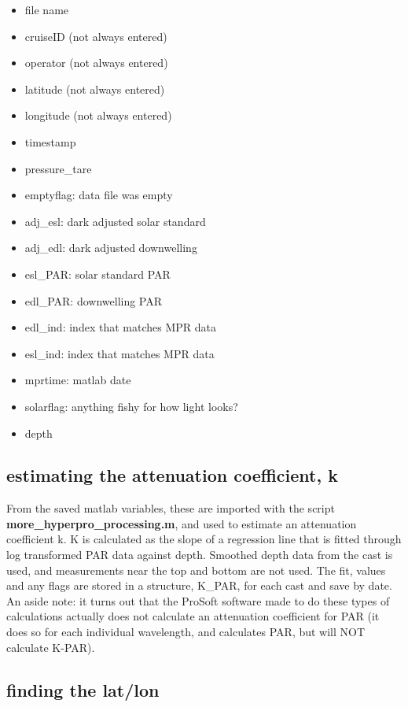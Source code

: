 \documentclass[11pt]{article}
\begin{document}
\begin{itemize}
\item file name \\
\item  cruiseID (not always entered)
\item operator  (not always entered)
\item latitude (not always entered) 
\item   longitude (not always entered)
\item    timestamp 
\item    pressure\_tare 
\item    emptyflag: data file was empty 
\item    adj\_esl: dark adjusted solar standard
\item    adj\_edl: dark adjusted downwelling
\item    esl\_PAR: solar standard PAR
\item    edl\_PAR: downwelling PAR
\item    edl\_ind: index that matches MPR data
\item    esl\_ind: index that matches MPR data
\item    mprtime: matlab date
\item    solarflag: anything fishy for how light looks?
\item    depth
\end{itemize}

\subsection{estimating the attenuation coefficient, k}

From the saved matlab variables, these are imported with the script \textbf{more\_hyperpro\_processing.m}, and used to estimate an attenuation coefficient k. K is calculated as the slope of a regression line that is fitted through log transformed PAR data against depth. Smoothed depth data from the cast is used, and measurements near the top and bottom are not used. The fit, values and any flags are stored in a structure, K\_PAR, for each cast and save by date.
\\

\noindent An aside note: it turns out that the ProSoft software made to do these types of calculations actually does not calculate an attenuation coefficient for PAR (it does so for each individual wavelength, and calculates PAR, but will NOT calculate K-PAR). 

\subsection{finding the lat/lon}
\end{document}
